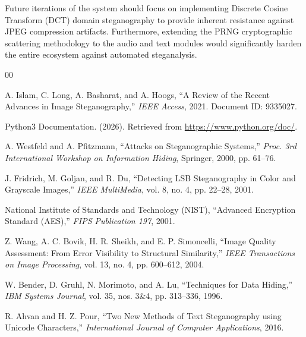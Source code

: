 \documentclass[12pt,a4paper]{report}
\begin{document}
Future iterations of the system should focus on implementing Discrete Cosine Transform (DCT) domain steganography to provide inherent resistance against JPEG compression artifacts. Furthermore, extending the PRNG cryptographic scattering methodology to the audio and text modules would significantly harden the entire ecosystem against automated steganalysis.

\cleardoublepage
{}
\begin{thebibliography}{00}

A. Islam, C. Long, A. Basharat, and A. Hoogs, 
``A Review of the Recent Advances in Image Steganography,'' 
\textit{IEEE Access}, 2021. Document ID: 9335027.

Python3 Documentation. (2026).
Retrieved from \url{https://www.python.org/doc/}.

A. Westfeld and A. Pfitzmann,
``Attacks on Steganographic Systems,''
\textit{Proc. 3rd International Workshop on Information Hiding},
Springer, 2000, pp. 61–76.

J. Fridrich, M. Goljan, and R. Du,
``Detecting LSB Steganography in Color and Grayscale Images,''
\textit{IEEE MultiMedia}, vol. 8, no. 4, pp. 22–28, 2001.

National Institute of Standards and Technology (NIST),
``Advanced Encryption Standard (AES),''
\textit{FIPS Publication 197}, 2001.

Z. Wang, A. C. Bovik, H. R. Sheikh, and E. P. Simoncelli,
``Image Quality Assessment: From Error Visibility to Structural Similarity,''
\textit{IEEE Transactions on Image Processing},
vol. 13, no. 4, pp. 600–612, 2004.

W. Bender, D. Gruhl, N. Morimoto, and A. Lu,
``Techniques for Data Hiding,''
\textit{IBM Systems Journal}, vol. 35, nos. 3\&4, pp. 313–336, 1996.

R. Ahvan and H. Z. Pour,
``Two New Methods of Text Steganography using Unicode Characters,''
\textit{International Journal of Computer Applications}, 2016.

\end{thebibliography}
\end{document}
